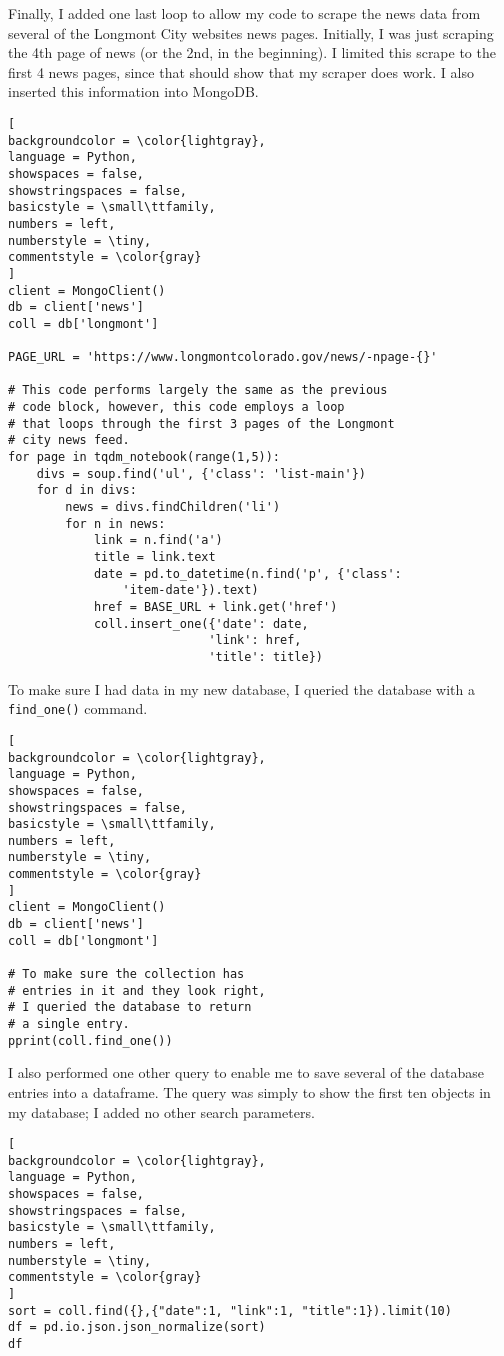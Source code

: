 \documentclass[]{article}
\newcommand{\code}[1]{\colorbox{light-gray}{\texttt{#1}}}
\begin{document}
Finally, I added one last loop to allow my code to scrape the news data from several of the Longmont City websites news pages.   Initially, I was just scraping the 4th page of news (or the 2nd, in the beginning).  I limited this scrape to the first 4 news pages, since that should show that my scraper does work.  I also inserted this information into MongoDB.
\begin{lstlisting}[
backgroundcolor = \color{lightgray},
language = Python,
showspaces = false,
showstringspaces = false,
basicstyle = \small\ttfamily,
numbers = left,
numberstyle = \tiny,
commentstyle = \color{gray}
]
client = MongoClient()
db = client['news']
coll = db['longmont']

PAGE_URL = 'https://www.longmontcolorado.gov/news/-npage-{}'

# This code performs largely the same as the previous
# code block, however, this code employs a loop
# that loops through the first 3 pages of the Longmont
# city news feed.  
for page in tqdm_notebook(range(1,5)):
	divs = soup.find('ul', {'class': 'list-main'})
	for d in divs:
		news = divs.findChildren('li')
		for n in news:
			link = n.find('a')
			title = link.text
			date = pd.to_datetime(n.find('p', {'class': 
				'item-date'}).text)
			href = BASE_URL + link.get('href')
			coll.insert_one({'date': date,
							'link': href,
							'title': title})

\end{lstlisting}

To make sure I had data in my new database, I queried the database with a \code{find\_one()} command.
\begin{lstlisting}[
backgroundcolor = \color{lightgray},
language = Python,
showspaces = false,
showstringspaces = false,
basicstyle = \small\ttfamily,
numbers = left,
numberstyle = \tiny,
commentstyle = \color{gray}
]
client = MongoClient()
db = client['news']
coll = db['longmont']

# To make sure the collection has
# entries in it and they look right,
# I queried the database to return
# a single entry. 
pprint(coll.find_one())

\end{lstlisting}
I also performed one other query to enable me to save several of the database entries into a dataframe.  The query was simply to show the first ten objects in my database; I added no other search parameters.
\begin{lstlisting}[
backgroundcolor = \color{lightgray},
language = Python,
showspaces = false,
showstringspaces = false,
basicstyle = \small\ttfamily,
numbers = left,
numberstyle = \tiny,
commentstyle = \color{gray}
]
sort = coll.find({},{"date":1, "link":1, "title":1}).limit(10)
df = pd.io.json.json_normalize(sort)
df
\end{lstlisting}
\end{document}
